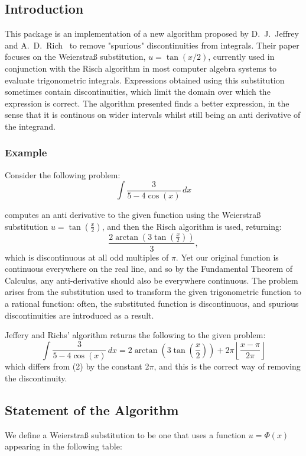   

\subsection{Introduction}
This package is an implementation of a new algorithm proposed by D.~J.~Jeffrey and A.~D.~Rich~\cite{JeffreyRich:94} to remove "spurious" discontinuities from integrals. Their paper focuses on the Weierstra\ss{} substitution, $u=\tan(x/2)$, currently used in conjunction with the Risch algorithm in most computer algebra systems to evaluate trigonometric integrals. Expressions obtained using this substitution sometimes contain discontinuities, which limit the domain over which the expression is correct. The algorithm presented finds a better expression, in the sense that it is continous on wider intervals whilst still being an anti derivative of the integrand.

\subsubsection{Example}
 Consider the following problem:
     \[ \int \frac{3}{5-4\cos(x)}\,dx  \]

\REDUCE computes an anti derivative to the given function using the Weierstra\ss{} substitution $u=\tan(\frac{x}{2})$, and then the Risch algorithm is used, returning:
    \[ \frac{2\arctan(3\tan(\frac{x}{2}))}{3}, \]
which is discontinuous at all odd multiples of $\pi$. Yet our original function is continuous everywhere on the real line, and so by the Fundamental Theorem of Calculus, any anti-derivative should also be everywhere continuous. The problem arises from the substitution used to transform the given trigonometric function to a rational function: often, the substituted function is discontinuous, and spurious discontinuities are introduced as a result.

Jeffery and Richs' algorithm returns the following to the given problem:
\[ \int \frac{3}{5-4\cos(x)}\,dx = 2\arctan\left(3\tan\left(\frac{x}{2}\right)\right)+2\pi\left\lfloor \frac{x-\pi}{2\pi} \right\rfloor \]
which differs from (2) by the constant 2$\pi$, and this is the correct way of removing the discontinuity.

\subsection{Statement of the Algorithm}
We define a Weierstra\ss{} substitution to be one that uses a function $u=\Phi(x)$ appearing in the following table:

